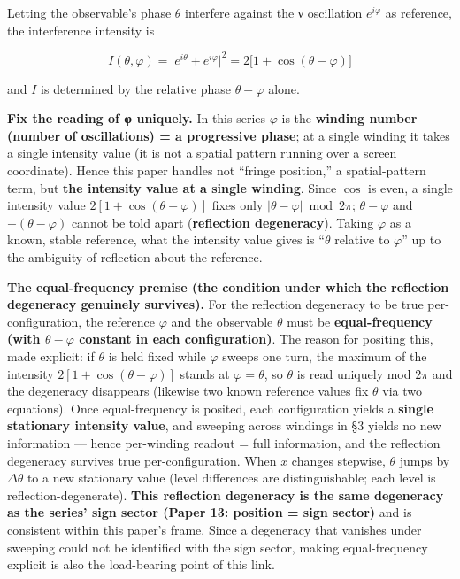 \documentclass[
]{ltjsarticle}
\begin{document}
Letting the observable's phase \(\theta\) interfere against the ν
oscillation \(e^{i\varphi}\) as reference, the interference intensity is

\[
I(\theta,\varphi)=\bigl|e^{i\theta}+e^{i\varphi}\bigr|^2=2\bigl[1+\cos(\theta-\varphi)\bigr]
\]

and \(I\) is determined by the relative phase \(\theta-\varphi\) alone.

\textbf{Fix the reading of φ uniquely.} In this series \(\varphi\) is
the \textbf{winding number (number of oscillations) = a progressive
phase}; at a single winding it takes a single intensity value (it is not
a spatial pattern running over a screen coordinate). Hence this paper
handles not ``fringe position,'' a spatial-pattern term, but \textbf{the
intensity value at a single winding}. Since \(\cos\) is even, a single
intensity value \(2[1+\cos(\theta-\varphi)]\) fixes only
\(|\theta-\varphi|\bmod 2\pi\); \(\theta-\varphi\) and
\(-(\theta-\varphi)\) cannot be told apart (\textbf{reflection
degeneracy}). Taking \(\varphi\) as a known, stable reference, what the
intensity value gives is ``\(\theta\) relative to \(\varphi\)'' up to
the ambiguity of reflection about the reference.

\textbf{The equal-frequency premise (the condition under which the
reflection degeneracy genuinely survives).} For the reflection
degeneracy to be true per-configuration, the reference \(\varphi\) and
the observable \(\theta\) must be \textbf{equal-frequency (with
\(\theta-\varphi\) constant in each configuration)}. The reason for
positing this, made explicit: if \(\theta\) is held fixed while
\(\varphi\) sweeps one turn, the maximum of the intensity
\(2[1+\cos(\theta-\varphi)]\) stands at \(\varphi=\theta\), so
\(\theta\) is read uniquely mod \(2\pi\) and the degeneracy disappears
(likewise two known reference values fix \(\theta\) via two equations).
Once equal-frequency is posited, each configuration yields a
\textbf{single stationary intensity value}, and sweeping across windings
in §3 yields no new information --- hence per-winding readout = full
information, and the reflection degeneracy survives true
per-configuration. When \(x\) changes stepwise, \(\theta\) jumps by
\(\Delta\theta\) to a new stationary value (level differences are
distinguishable; each level is reflection-degenerate). \textbf{This
reflection degeneracy is the same degeneracy as the series' sign sector
(Paper 13: position = sign sector)} and is consistent within this
paper's frame. Since a degeneracy that vanishes under sweeping could not
be identified with the sign sector, making equal-frequency explicit is
also the load-bearing point of this link.
\end{document}

